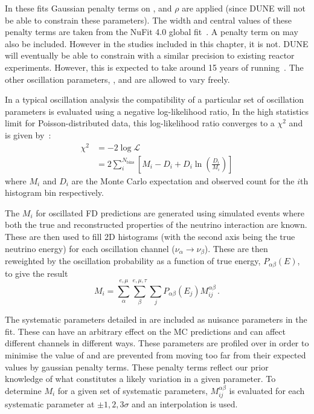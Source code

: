 In these fits Gaussian penalty terms on ,  and $\rho$ are applied (since DUNE will not be able to constrain these parameters).
The width and central values of these penalty terms are taken from the NuFit 4.0 global fit~\cite{nufit4}.
A penalty term on  may also be included.
However in the studies included in this chapter, it is not.
DUNE will eventually be able to constrain  with a similar precision to existing reactor experiments. 
However, this is expected to take around 15 years of running~\cite{tdrVol2}.
The other oscillation parameters, ,  and \dcp are allowed to vary freely.

In a typical oscillation analysis the compatibility of a particular set of oscillation parameters is evaluated using a negative log-likelihood ratio,
In the high statistics limit for Poisson-distributed data, this log-likelihood ratio converges to a $\chi^{2}$ and is given by~\cite{pdg2018}:
\begin{align}
	\chi^{2} &= -2 \log \mathcal{L} \\
	& = 2 \sum_{i}^{N_{\text{bins}}} \left[ M_{i} - D_{i} + D_{i} \ln \left( \frac{D_{i}}{M_{i}} \right) \right]
\end{align}
where $M_{i}$ and $D_{i}$ are the Monte Carlo expectation and observed count for the $i$th histogram bin respectively.

The $M_{i}$ for oscillated FD predictions are generated using simulated events where both the true and reconstructed properties of the neutrino interaction are known.
These are then used to fill 2D histograms (with the second axis being the true neutrino energy) for each oscillation channel ($\nu_{\alpha} \rightarrow \nu_{\beta}$).
These are then reweighted by the oscillation probability as a function of true energy, $P_{\alpha\beta}(E)$, to give the result
\begin{equation}
	M_{i} = \sum_{\alpha}^{e, \mu} \sum_{\beta}^{e, \mu, \tau} \sum_{j} P_{\alpha\beta}(E_{j}) M_{ij}^{\alpha\beta} \, .	
\end{equation}

The systematic parameters detailed in  are included as nuisance parameters in the fit. 
These can have an arbitrary effect on the MC predictions and can affect different channels in different ways.
These parameters are profiled over in order to minimise the value of \chisquare and are prevented from moving too far from their expected values by gaussian penalty terms.
These penalty terms reflect our prior knowledge of what constitutes a likely variation in a given parameter.
To determine $M_{i}$ for a given set of systematic parameters, $M_{ij}^{\alpha\beta}$ is evaluated for each systematic parameter at $\pm1,2,3\sigma$ and an interpolation is used.

